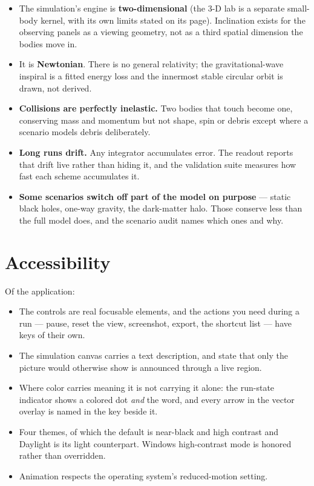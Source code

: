 \documentclass[11pt,a4paper]{article}
\begin{document}
\begin{itemize}
  \item The simulation's engine is \textbf{two-dimensional} (the 3-D lab is a separate small-body kernel, with its own limits stated on its page). Inclination exists for the
  observing panels as a viewing geometry, not as a third spatial dimension the
  bodies move in.
  \item It is \textbf{Newtonian}. There is no general relativity; the
  gravitational-wave inspiral is a fitted energy loss and the innermost stable
  circular orbit is drawn, not derived.
  \item \textbf{Collisions are perfectly inelastic.} Two bodies that touch
  become one, conserving mass and momentum but not shape, spin or debris except
  where a scenario models debris deliberately.
  \item \textbf{Long runs drift.} Any integrator accumulates error. The readout
  reports that drift live rather than hiding it, and the validation suite
  measures how fast each scheme accumulates it.
  \item \textbf{Some scenarios switch off part of the model on purpose} ---
  static black holes, one-way gravity, the dark-matter halo. Those conserve less
  than the full model does, and the scenario audit names which ones and why.
\end{itemize}

\section{Accessibility}

Of the application:

\begin{itemize}
  \item The controls are real focusable elements, and the actions you need
  during a run --- pause, reset the view, screenshot, export, the shortcut list
  --- have keys of their own.
  \item The simulation canvas carries a text description, and state that only
  the picture would otherwise show is announced through a live region.
  \item Where color carries meaning it is not carrying it alone: the run-state
  indicator shows a colored dot \emph{and} the word, and every arrow in the
  vector overlay is named in the key beside it.
  \item Four themes, of which the default is near-black and high contrast and
  Daylight is its light counterpart. Windows high-contrast mode is honored
  rather than overridden.
  \item Animation respects the operating system's reduced-motion setting.
\end{itemize}
\end{document}
